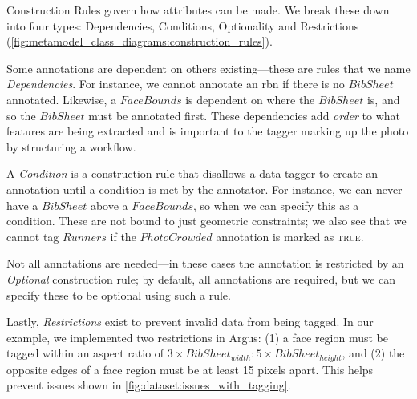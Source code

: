 Construction Rules govern how attributes can be made. We break these down into four types: Dependencies, Conditions, Optionality and Restrictions (\cref{fig:metamodel_class_diagrams:construction_rules}).

Some annotations are dependent on others existing---these are rules that we name \textit{Dependencies}. For instance, we cannot annotate an \gls{rbn} if there is no $BibSheet$ annotated. Likewise, a $FaceBounds$ is dependent on where the $BibSheet$ is, and so the $BibSheet$ must be annotated first. These dependencies add \textit{order} to what features are being extracted and is important to the tagger marking up the photo by structuring a workflow.

A \textit{Condition} is a construction rule that disallows a data tagger to create an annotation until a condition is met by the annotator. For instance, we can never have a $BibSheet$ above a $FaceBounds$, so when we can specify this as a condition. These are not bound to just geometric constraints; we also see that we cannot tag $Runners$ if the $PhotoCrowded$ annotation is marked as \textsc{true}. 

Not all annotations are needed---in these cases the annotation is restricted by an \textit{Optional} construction rule; by default, all annotations are required, but we can specify these to be optional using such a rule. 

Lastly, \textit{Restrictions} exist to prevent invalid data from being tagged. In our example, we implemented two restrictions in Argus: (1) a face region must be tagged within an aspect ratio of $3 \times BibSheet_{width} : 5 \times BibSheet_{height}$, and (2) the opposite edges of a face region must be at least 15 pixels apart. This helps prevent issues shown in \cref{fig:dataset:issues_with_tagging}.

